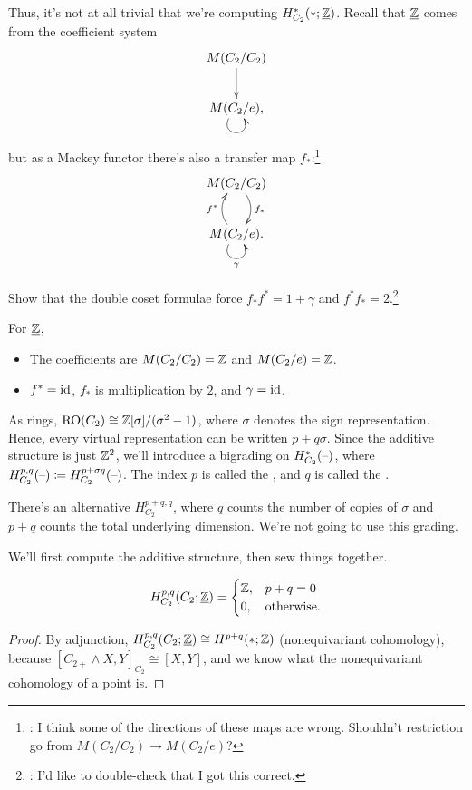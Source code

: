 Thus, it's not at all trivial that we're computing $H_{C_2}^*(*;\underline{\mathbb Z})$. Recall that $\underline{\mathbb Z}$ comes
from the coefficient system
\[\xymatrix{
	M(C_2/C_2)\ar[d]\\
	M(C_2/e),\ar@(dl,dr)_{}
}\]
but as a Mackey functor there's also a transfer map $f_*$:\footnote{\TODO: I think some of the directions of these
maps are wrong. Shouldn't restriction go from $M(C_2/C_2)\to M(C_2/e)$?}
\[\xymatrix{
	M(C_2/C_2)\ar@/^0.4cm/[d]^{f_*}\\
	M(C_2/e).\ar@/^0.4cm/[u]^{f^*}\ar@(dl,dr)_\gamma
}\]
\begin{ex}
Show that the double coset formulae force $f_*f^* = 1+\gamma$ and $f^*f_* = 2$.\footnote{\TODO: I'd like to
double-check that I got this correct.}
\end{ex}
For $\underline{\mathbb Z}$,
\begin{itemize}
	\item The coefficients are $M(C_2/C_2) = \mathbb Z$ and $M(C_2/e) = \mathbb Z$.
	\item $f^* = \mathrm{id}$, $f_*$ is multiplication by $2$, and $\gamma = \mathrm{id}$.
\end{itemize}
As rings, $\mathrm{RO}(C_2)\cong\mathbb Z[\sigma]/(\sigma^2-1)$, where $\sigma$ denotes the sign representation. Hence, every virtual representation can be written $p+q\sigma$. Since
the additive structure is just $\mathbb Z^2$, we'll introduce a bigrading on $H^*_{C_2}(\text{--})$, where $H_{C_2}^{p,q}(\text{--})
\coloneqq H_{C_2}^{p+\sigma q}(\text{--})$. The index $p$ is called the , and $q$ is called the .
\begin{rem}
There's an alternative  $H_{C_2}^{p+q,q}$, where $q$ counts
the number of copies of $\sigma$ and $p+q$ counts the total underlying dimension. We're not going to use this
grading.
\end{rem}
We'll first compute the additive structure, then sew things together.
\begin{lem}
\[H_{C_2}^{p,q}(C_2; \underline{\mathbb Z}) = \begin{cases}
	\mathbb Z, &p+q=0\\
	0, &\text{\rm otherwise.}
\end{cases}\]
\end{lem}
\begin{proof}
By adjunction, $H_{C_2}^{p,q}(C_2;\underline{\mathbb Z})\cong H^{p+q}(*;\mathbb Z)$ (nonequivariant cohomology), because
$[C_{2+}\wedge X, Y]_{C_2}\cong [X,Y]$, and we know what the nonequivariant cohomology of a point is.
\end{proof}
